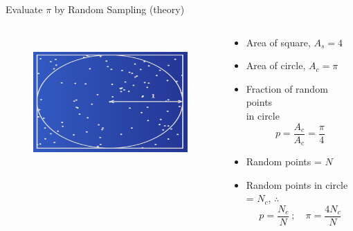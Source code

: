 \documentclass[xcolor=x11names,compress]{beamer}
\renewcommand{\(}{\begin{columns}}
\renewcommand{\)}{\end{columns}}
\newcommand{\<}[1]{\begin{column}{#1}}
\renewcommand{\>}{\end{column}}
\begin{document}
\begin{frame}{Evaluate $\pi$ by Random Sampling (theory)}

\begin{columns}
  \begin{column}{0.45\textwidth}
  	\begin{figure}
  	\begin{center}
  		\includegraphics[height=2in,clip]{pi-circle}
	\end{center}
  	\end{figure}
  \end{column}
  \begin{column}{0.55\textwidth}
    \begin{itemize}
    \item Area of square, $A_s= 4$
    \item Area of circle, $A_c = \pi$
    \item Fraction of random points \\in circle
    \[p = \frac{A_c}{A_c} = \frac{\pi}{4}\]
    \item Random points = $N$
    \item Random points in circle  = $N_c$, $\therefore$
    \[p = \frac{N_c}{N}\:; \quad \pi = \frac{4N_c}{N}\]
    \end{itemize}
  \end{column}
\end{columns}
\end{frame}
\end{document}
